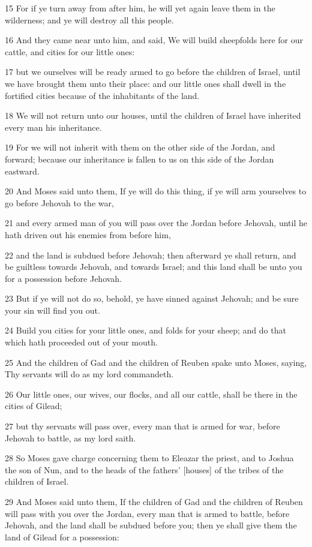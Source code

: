 \par 15 For if ye turn away from after him, he will yet again leave them in the wilderness; and ye will destroy all this people.
\par 16 And they came near unto him, and said, We will build sheepfolds here for our cattle, and cities for our little ones:
\par 17 but we ourselves will be ready armed to go before the children of Israel, until we have brought them unto their place: and our little ones shall dwell in the fortified cities because of the inhabitants of the land.
\par 18 We will not return unto our houses, until the children of Israel have inherited every man his inheritance.
\par 19 For we will not inherit with them on the other side of the Jordan, and forward; because our inheritance is fallen to us on this side of the Jordan eastward.
\par 20 And Moses said unto them, If ye will do this thing, if ye will arm yourselves to go before Jehovah to the war,
\par 21 and every armed man of you will pass over the Jordan before Jehovah, until he hath driven out his enemies from before him,
\par 22 and the land is subdued before Jehovah; then afterward ye shall return, and be guiltless towards Jehovah, and towards Israel; and this land shall be unto you for a possession before Jehovah.
\par 23 But if ye will not do so, behold, ye have sinned against Jehovah; and be sure your sin will find you out.
\par 24 Build you cities for your little ones, and folds for your sheep; and do that which hath proceeded out of your mouth.
\par 25 And the children of Gad and the children of Reuben spake unto Moses, saying, Thy servants will do as my lord commandeth.
\par 26 Our little ones, our wives, our flocks, and all our cattle, shall be there in the cities of Gilead;
\par 27 but thy servants will pass over, every man that is armed for war, before Jehovah to battle, as my lord saith.
\par 28 So Moses gave charge concerning them to Eleazar the priest, and to Joshua the son of Nun, and to the heads of the fathers' [houses] of the tribes of the children of Israel.
\par 29 And Moses said unto them, If the children of Gad and the children of Reuben will pass with you over the Jordan, every man that is armed to battle, before Jehovah, and the land shall be subdued before you; then ye shall give them the land of Gilead for a possession:
